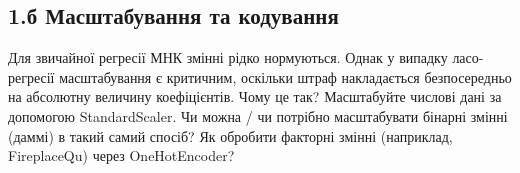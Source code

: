 \Needspace{422pt}

\subsection{1.б Масштабування та кодування}

\begin{taskstatement}Для звичайної регресії МНК змінні рідко нормуються. Однак у випадку
ласо-регресії масштабування є критичним, оскільки штраф накладається
безпосередньо на абсолютну величину коефіцієнтів. Чому це так?
Масштабуйте числові дані за допомогою StandardScaler. Чи можна / чи
потрібно масштабувати бінарні змінні (даммі) в такий самий спосіб? Як
обробити факторні змінні (наприклад, FireplaceQu) через OneHotEncoder?
\end{taskstatement}


